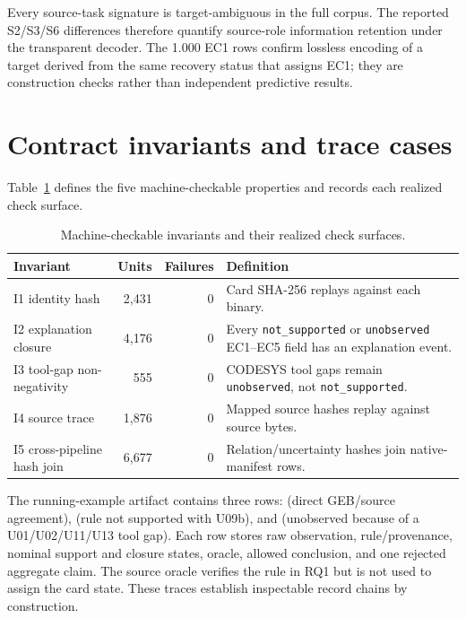\documentclass[a4paper,fleqn]{cas-dc}
\begin{document}
Every source-task signature is target-ambiguous in the full corpus. The reported S2/S3/S6 differences therefore quantify source-role information retention under the transparent decoder. The 1.000 EC1 rows confirm lossless encoding of a target derived from the same recovery status that assigns EC1; they are construction checks rather than independent predictive results.

\section{Contract invariants and trace cases}

Table~\ref{tab:contract_invariants} defines the five machine-checkable properties and records each realized check surface.

\begin{table}[t]
\centering
\small
\caption{Machine-checkable invariants and their realized check surfaces.}
\label{tab:contract_invariants}
\begin{tabularx}{\textwidth}{>{\raggedright\arraybackslash}p{}rr>{\raggedright\arraybackslash}X}
\toprule
Invariant & Units & Failures & Definition \\
\midrule
I1 identity hash & 2,431 & 0 & Card SHA-256 replays against each binary. \\
I2 explanation closure & 4,176 & 0 & Every \texttt{not\_supported} or \texttt{unobserved} EC1--EC5 field has an explanation event. \\
I3 tool-gap non-negativity & 555 & 0 & CODESYS tool gaps remain \texttt{unobserved}, not \texttt{not\_supported}. \\
I4 source trace & 1,876 & 0 & Mapped source hashes replay against source bytes. \\
I5 cross-pipeline hash join & 6,677 & 0 & Relation/uncertainty hashes join native-manifest rows. \\
\bottomrule
\end{tabularx}
\end{table}

The running-example artifact contains three rows:  (direct GEB/source agreement),  (rule not supported with U09b), and  (unobserved because of a U01/U02/U11/U13 tool gap). Each row stores raw observation, rule/provenance, nominal support and closure states, oracle, allowed conclusion, and one rejected aggregate claim. The source oracle verifies the rule in RQ1 but is not used to assign the card state. These traces establish inspectable record chains by construction.
\end{document}

